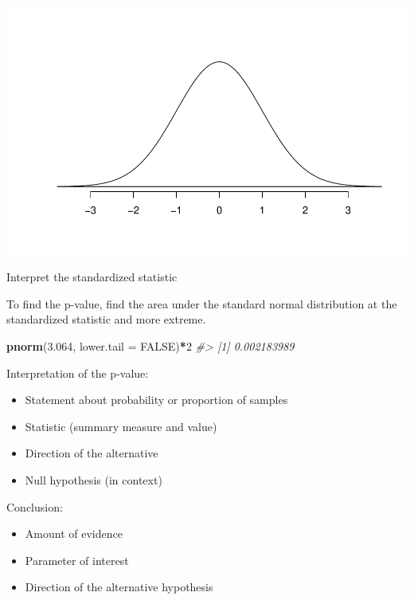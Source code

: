 \documentclass[
]{report}
\newenvironment{Shaded}{\begin{snugshade}}{\end{snugshade}}
\newcommand{\AttributeTok}[1]{\textcolor[rgb]{0.13,0.29,0.53}{#1}}
\newcommand{\CommentTok}[1]{\textcolor[rgb]{0.56,0.35,0.01}{\textit{#1}}}
\newcommand{\ConstantTok}[1]{\textcolor[rgb]{0.56,0.35,0.01}{#1}}
\newcommand{\DecValTok}[1]{\textcolor[rgb]{0.00,0.00,0.81}{#1}}
\newcommand{\FloatTok}[1]{\textcolor[rgb]{0.00,0.00,0.81}{#1}}
\newcommand{\FunctionTok}[1]{\textcolor[rgb]{0.13,0.29,0.53}{\textbf{#1}}}
\newcommand{\NormalTok}[1]{#1}
\newcommand{\SpecialCharTok}[1]{\textcolor[rgb]{0.81,0.36,0.00}{\textbf{#1}}}
\begin{document}
\vspace{0.5in}

\begin{center}\includegraphics[width=0.5\linewidth]{07-LN07-1cat_theory_files/figure-latex/standNormalc-1} \end{center}

Interpret the standardized statistic

\vspace{0.5in}

To find the p-value, find the area under the standard normal distribution at the standardized statistic and more extreme.

\begin{Shaded}
\begin{Highlighting}[]
\FunctionTok{pnorm}\NormalTok{(}\FloatTok{3.064}\NormalTok{, }\AttributeTok{lower.tail =} \ConstantTok{FALSE}\NormalTok{)}\SpecialCharTok{*}\DecValTok{2}
\CommentTok{\#\textgreater{} [1] 0.002183989}
\end{Highlighting}
\end{Shaded}

Interpretation of the p-value:

\begin{itemize}
\item
  Statement about probability or proportion of samples
\item
  Statistic (summary measure and value)
\item
  Direction of the alternative
\item
  Null hypothesis (in context)
\end{itemize}

\vspace{0.6in}

Conclusion:

\begin{itemize}
\item
  Amount of evidence
\item
  Parameter of interest
\item
  Direction of the alternative hypothesis
\end{itemize}
\end{document}
